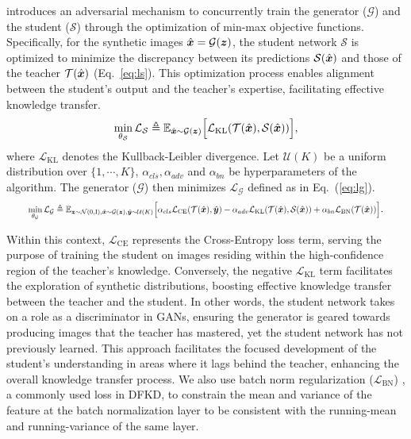 \documentclass{article} %
\begin{document}
\cite{zskd} introduces an adversarial mechanism to concurrently train the generator ($\mathcal{G}$) and the student ($\mathcal{S}$) through the optimization of min-max objective functions. Specifically, for the synthetic images $\hat{{\bm{x}}} = \mathcal{G}({\bm{z}})$, the student network $\mathcal{S}$ is optimized to minimize the discrepancy between its predictions $\mathcal{S}(\hat{{\bm{x}}})$ and those of the teacher $\mathcal{T}(\hat{{\bm{x}}})$ (Eq.~\ref{eq:ls}). This optimization process enables alignment between the student's output and the teacher's expertise, facilitating effective knowledge transfer.
\begin{equation}
    \min\limits_{\theta_\mathcal{S}}\mathcal{L}_\mathcal{S} \triangleq \mathbb{E}_{\hat{{\bm{x}}} \sim\mathcal{G}({\bm{z}})}\Big[\mathcal{L}_\text{KL}(\mathcal{T}(\hat{{\bm{x}}}),\mathcal{S}(\hat{{\bm{x}}}))\Big],
    \label{eq:ls}
\end{equation}
where $\mathcal{L}_\text{KL}$ denotes the Kullback-Leibler divergence. Let $\mathcal{U}(K)$ be a uniform distribution over $\{1,\cdots,K\}$, $\alpha_{cls}, \alpha_{adv}$ and $\alpha_{bn}$ be hyperparameters of the algorithm. The generator ($\mathcal{G}$) then minimizes $\mathcal{L}_\mathcal{G}$  defined as in Eq.~(\ref{eq:lg}).
\begin{align}
    \label{eq:lg}
\resizebox{0.92\textwidth}{!}{%
      $\min\limits_{\theta_\mathcal{G}}\mathcal{L}_\mathcal{G} \triangleq \mathbb{E}_{\vz \sim \mathcal{N}(0,\text{I}),\hat{\vx} \sim\mathcal{G}(\vz), \hat{\vy} \sim \mathcal{U}(K)}\Big[\alpha_{cls}\mathcal{L}_\text{CE}(\mathcal{T}(\hat{\vx}), \hat{\vy})-\alpha_{adv}\mathcal{L}_\text{KL}(\mathcal{T}(\hat{\vx}),\mathcal{S}(\hat{\vx}))+\alpha_{bn}\mathcal{L}_\text{BN}(\mathcal{T}(\hat{\vx}))\Big]$%
}.
\end{align}

Within this context, $\mathcal{L}_\text{CE}$ represents the Cross-Entropy loss term, serving the purpose of training the student on images residing within the high-confidence region of the teacher's knowledge. Conversely, the negative $\mathcal{L}_\text{KL}$ term facilitates the exploration of synthetic distributions, boosting effective knowledge transfer between the teacher and the student. In other words, the student network takes on a role as a discriminator in GANs, ensuring the generator is geared towards producing images that the teacher has mastered, yet the student network has not previously learned. This approach facilitates the focused development of the student's understanding in areas where it lags behind the teacher, enhancing the overall knowledge transfer process. We also use batch norm regularization ($\mathcal{L}_\text{BN}$) \citep{adi,fastdfkd}, a commonly used loss in DFKD, to constrain the mean and variance of the feature at the batch normalization layer to be consistent with the running-mean and running-variance of the same layer.
\end{document}
